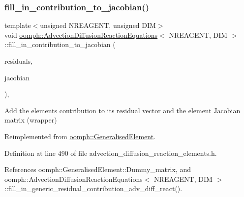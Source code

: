 \subsubsection{\texorpdfstring{fill\+\_\+in\+\_\+contribution\+\_\+to\+\_\+jacobian()}{fill\_in\_contribution\_to\_jacobian()}}
{\footnotesize\ttfamily template$<$unsigned N\+R\+E\+A\+G\+E\+NT, unsigned D\+IM$>$ \\
void \hyperlink{classoomph_1_1AdvectionDiffusionReactionEquations}{oomph\+::\+Advection\+Diffusion\+Reaction\+Equations}$<$ N\+R\+E\+A\+G\+E\+NT, D\+IM $>$\+::fill\+\_\+in\+\_\+contribution\+\_\+to\+\_\+jacobian (\begin{DoxyParamCaption}\item[{\hyperlink{classoomph_1_1Vector}{Vector}$<$ double $>$ \&}]{residuals,  }\item[{\hyperlink{classoomph_1_1DenseMatrix}{Dense\+Matrix}$<$ double $>$ \&}]{jacobian }\end{DoxyParamCaption})\hspace{0.3cm}{\ttfamily [inline]}, {\ttfamily [virtual]}}



Add the element\textquotesingle{}s contribution to its residual vector and the element Jacobian matrix (wrapper) 



Reimplemented from \hyperlink{classoomph_1_1GeneralisedElement_a6ae09fc0d68e4309ac1b03583d252845}{oomph\+::\+Generalised\+Element}.



Definition at line 490 of file advection\+\_\+diffusion\+\_\+reaction\+\_\+elements.\+h.



References oomph\+::\+Generalised\+Element\+::\+Dummy\+\_\+matrix, and oomph\+::\+Advection\+Diffusion\+Reaction\+Equations$<$ N\+R\+E\+A\+G\+E\+N\+T, D\+I\+M $>$\+::fill\+\_\+in\+\_\+generic\+\_\+residual\+\_\+contribution\+\_\+adv\+\_\+diff\+\_\+react().

\mbox{\label{classoomph_1_1AdvectionDiffusionReactionEquations_ae316c9cbe79a215744dc52bd19fb1a27}} 
